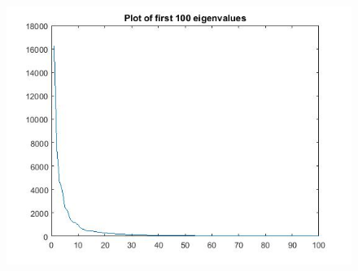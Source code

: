 \documentclass{article}
\begin{document}
\begin{figure}[H]

\includegraphics[scale =.5]{report7_eig}
\end{figure}
\end{document}
